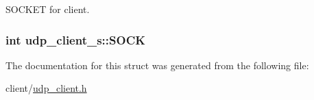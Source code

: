 S\-O\-C\-K\-E\-T for client. 

\hypertarget{structudp__client__s_a34736fa42fc33898eda04c9269458125}{
\subsubsection[{S\-O\-C\-K}]{\setlength{\rightskip}{0pt plus 5cm}int udp\-\_\-client\-\_\-s\-::\-S\-O\-C\-K}}\label{structudp__client__s_a34736fa42fc33898eda04c9269458125}


The documentation for this struct was generated from the following file\-:\begin{DoxyCompactItemize}
\item 
client/\hyperlink{udp__client_8h}{udp\-\_\-client.\-h}\end{DoxyCompactItemize}
